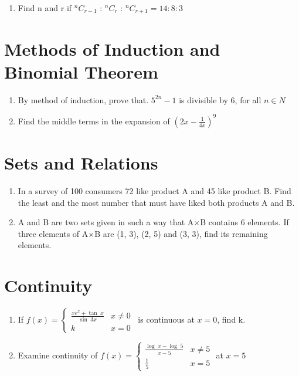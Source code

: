 \documentclass[14pt]{article}
\begin{document}
\begin{multicols}{2}
\begin{enumerate}
\item Find n and r
	if $^nC_{r-1}$ : $^nC_r$ : $^nC_{r+1} = 14:8:3$

\end{enumerate} 


\section{Methods of Induction and Binomial Theorem}
\noindent
\begin{enumerate}
\item By method of induction, prove that.
	$5^{2n} - 1$ is divisible by 6, for all $n \in N$
	
\item Find the middle terms in the expansion of $\left(2x - \frac{1}{4x}\right)^9$

\end{enumerate} 

\section{Sets and Relations}
\noindent
\begin{enumerate}
\item In a survey of 100 consumers 72
like product A and 45 like product B. Find the
least and the most number that must have liked
both products A and B.

\item A and B are two sets given in such a way
that A$\times$B contains 6 elements. If three elements of
A$\times$B are (1, 3), (2, 5) and (3, 3), find its remaining
elements.

\end{enumerate} 


\section{Continuity}
\noindent
\begin{enumerate}
\item If
$f(x) =  \begin{cases} 
       \frac{xe^x+\tan\;x}{\sin\;3x} & x\neq 0 \\
        k                            &  x = 0 
   \end{cases}$\, is continuous at $x=0$, find k.


\item Examine continuity of
$f(x) =  \begin{cases} 
       \frac{\log\;x - \log\;5}{x - 5} & x\neq 5 \\ 
        \frac{1}{5}                           &  x = 5
   \end{cases}$ at $ x  = 5$



\end{enumerate}
\end{multicols}
\end{document}
